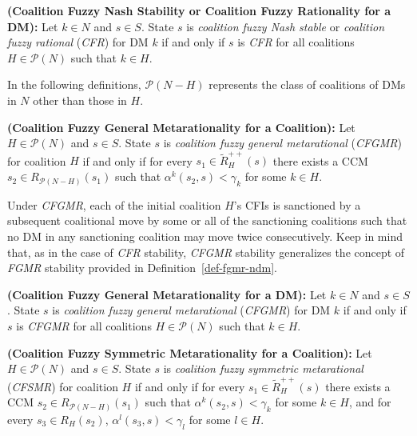 \begin{definition}\label{def-cfr-dm}
\rm {\bf (Coalition Fuzzy Nash Stability or Coalition Fuzzy Rationality for a DM):} Let $k \in N$ and $s \in S$. State $s$ is \emph{coalition fuzzy Nash stable} or \emph{coalition fuzzy rational} (\emph{CFR}) for DM $k$ if and only if $s$ is \emph{CFR} for all coalitions $H \in \mathcal{P}(N)$ such that $k \in H$.
\end{definition}

In the following definitions, $\mathcal{P}(N-H)$ represents the class of coalitions of DMs in $N$ other than those in $H$.

\begin{definition}\label{def-cfgmr-coal}
\rm {\bf (Coalition Fuzzy General Metarationality for a Coalition):}
Let $H \in \mathcal{P}(N)$ and $s \in S$. State $s$ is \emph{coalition fuzzy general metarational} (\emph{CFGMR}) for coalition $H$ if and only if for every $s_1 \in \widetilde{R}_H^{++}(s)$ there exists a CCM $s_2 \in R_{\mathcal{P}(N-H)}(s_1)$ such that $\alpha^k(s_2, s)<\gamma_k$ for some $k \in H$.
\end{definition}

Under \emph{CFGMR}, each of the initial coalition $H$'s CFIs is sanctioned by a subsequent coalitional move by some or all of the sanctioning coalitions such that no DM in any sanctioning coalition may move twice consecutively. Keep in mind that, as in the case of \emph{CFR} stability, \emph{CFGMR} stability generalizes the concept of \emph{FGMR} stability provided in Definition~\ref{def-fgmr-ndm}.

\begin{definition}\label{def-cfgmr-dm}
\rm {\bf (Coalition Fuzzy General Metarationality for a DM):} Let $k \in N$ and $s \in S$. State $s$ is \emph{coalition fuzzy general metarational} (\emph{CFGMR}) for DM $k$ if and only if $s$ is \emph{CFGMR} for all coalitions $H \in \mathcal{P}(N)$ such that $k \in H$.
\end{definition}

\begin{definition}\label{def-cfsmr-coal}
\rm {\bf (Coalition Fuzzy Symmetric Metarationality for a Coalition):} Let $H \in \mathcal{P}(N)$ and $s \in S$. State $s$ is \emph{coalition fuzzy symmetric metarational} (\emph{CFSMR}) for coalition $H$ if and only if for every $s_1 \in \widetilde{R}_H^{++}(s)$ there exists a CCM $s_2 \in R_{\mathcal{P}(N-H)}(s_1)$ such that $\alpha^k(s_2, s)<\gamma_k$ for some $k \in H$, and for every $s_3 \in R_H(s_2)$, $\alpha^l(s_3, s)<\gamma_l$ for some $l \in H$.
\end{definition}

